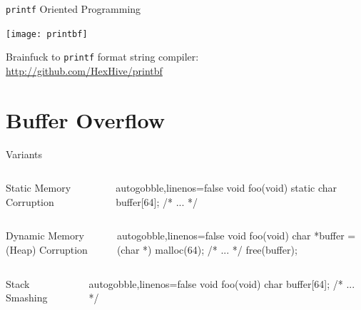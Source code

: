 \documentclass[beamer]{uibk}
\begin{document}
\begin{frame}{\texttt{printf} Oriented Programming}
    \begin{center}
        \texttt{[image: printbf]}
    \end{center}

    Brainfuck to \texttt{printf} format string compiler:\\
    \url{http://github.com/HexHive/printbf}
\end{frame}

\section{Buffer Overflow}

\begin{frame}[fragile]{Variants}
    \begin{columns}
        \begin{column}{0.5\textwidth}
            Static Memory Corruption
        \end{column}
        \begin{column}{0.5\textwidth}
            \begin{ccode*}{autogobble,linenos=false}
                void foo(void) {
                    static char buffer[64];
                    /* ... */
                }
            \end{ccode*}
        \end{column}
    \end{columns}
    \medskip
    \pause
    \begin{columns}
        \begin{column}{0.5\textwidth}
            Dynamic Memory (Heap) Corruption
        \end{column}
        \begin{column}{0.5\textwidth}
            \begin{ccode*}{autogobble,linenos=false}
                void foo(void) {
                    char *buffer = (char *) malloc(64);
                    /* ... */
                    free(buffer);
                }
            \end{ccode*}
        \end{column}
    \end{columns}
    \medskip
    \pause
    \begin{columns}
        \begin{column}{0.5\textwidth}
            Stack Smashing
        \end{column}
        \begin{column}{0.5\textwidth}
            \begin{ccode*}{autogobble,linenos=false}
                void foo(void) {
                    char buffer[64];
                    /* ... */
                }
            \end{ccode*}
        \end{column}
    \end{columns}
\end{frame}
\end{document}
